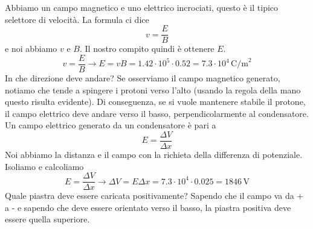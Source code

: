 \begin{center}
\end{center}
\divisor

Abbiamo un campo magnetico e uno elettrico incrociati, questo è il tipico selettore di velocità.
La formula ci dice
\begin{equation*}
  v = \frac{E}{B}
\end{equation*}
e noi abbiamo $v$ e $B$. Il nostro compito quindi è ottenere $E$.
\begin{equation*}
  v = \frac{E}{B} \rightarrow E = vB = 1.42\cdot10^5\cdot0.52 = 
  \boxed{7.3\cdot10^4\,\text{C/m}^2}
\end{equation*}
In che direzione deve andare? Se osserviamo il campo magnetico generato, notiamo che tende a 
spingere i protoni verso l'alto (usando la regola della mano questo risulta evidente). Di
conseguenza, se si vuole mantenere stabile il protone, il campo elettrico deve andare verso
il basso, perpendicolarmente al condensatore.\\ [\baselineskip]
Un campo elettrico generato da un condensatore è pari a 
\begin{equation*}
  E = \frac{\Delta V}{\Delta x}
\end{equation*}
Noi abbiamo la distanza e il campo con la richieta della differenza di potenziale. Isoliamo
e calcoliamo
\begin{equation*}
  E = \frac{\Delta V}{\Delta x} \rightarrow \Delta V = E\Delta x = 7.3\cdot10^4\cdot0.025 = 
  \boxed{1846\,\text{V}}
\end{equation*}
Quale piastra deve essere caricata positivamente? Sapendo che il campo va da + a - e sapendo che
deve essere orientato verso il basso, la piastra positiva deve essere quella superiore.

